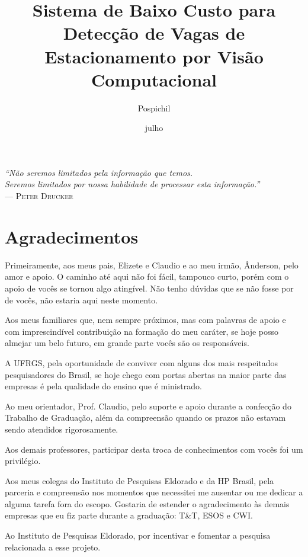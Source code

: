 \documentclass[ecp,tc]{iiufrgs}
\title{Sistema de Baixo Custo para Detecção de Vagas de Estacionamento por Visão Computacional}
\author{Pospichil}{Bruno Meybom}
\date{julho}{2015}
\begin{document}
\maketitle

\clearpage
\begin{flushright}
\mbox{}\vfill
{\sffamily\itshape
``Não seremos limitados pela informação que temos.\\
Seremos limitados por nossa habilidade de processar esta informação.''\\}
--- \textsc{Peter Drucker}
\end{flushright}

\chapter*{Agradecimentos}
Primeiramente, aos meus pais, Elizete e Claudio e ao meu irmão, Ânderson, pelo amor e apoio. O caminho até aqui não foi fácil, tampouco curto, porém com o apoio de vocês se tornou algo atingível. Não tenho dúvidas que se não fosse por de vocês, não estaria aqui neste momento.

Aos meus familiares que, nem sempre próximos, mas com palavras de apoio e com imprescindível contribuição na formação do meu caráter, se hoje posso almejar um belo futuro, em grande parte vocês são os responsáveis.

A UFRGS, pela oportunidade de conviver com alguns dos mais respeitados pesquisadores do Brasil, se hoje chego com portas abertas na maior parte das empresas é pela qualidade do ensino que é ministrado.

Ao meu orientador, Prof. Claudio, pelo suporte e apoio durante a confecção do Trabalho de Graduação, além da compreensão quando os prazos não estavam sendo atendidos rigorosamente.

Aos demais professores, participar desta troca de conhecimentos com vocês foi um privilégio.

Aos meus colegas do Instituto de Pesquisas Eldorado e da HP Brasil, pela parceria e compreensão nos momentos que necessitei me ausentar ou me dedicar a alguma tarefa fora do escopo. Gostaria de estender o agradecimento às demais empresas que eu fiz parte durante a graduação: T\&T, ESOS e CWI.

Ao Instituto de Pesquisas Eldorado, por incentivar e fomentar a pesquisa relacionada a esse projeto. 
\end{document}
